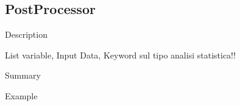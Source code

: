 %



\subsection{PostProcessor}
\label{sec:models_postProcessor}

Description

List variable, Input Data, 
Keyword sul tipo analisi statistica!!

Summary

Example
